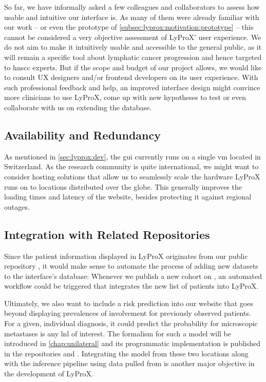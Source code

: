 \documentclass[\relativeRoot/main.tex]{subfiles}
\begin{document}
So far, we have informally asked a few colleagues and collaborators to assess how usable and intuitive our interface is. As many of them were already familiar with our work -- or even the prototype of \cref{subsec:lyprox:motivation:prototype} -- this cannot be considered a very objective assessment of LyProX' user experience. We do not aim to make it intuitively usable and accessible to the general public, as it will remain a specific tool about lymphatic cancer progression and hence targeted to \gls{hnscc} experts. But if the scope and budget of our project allows, we would like to consult UX designers and/or frontend developers on its user experience. With such professional feedback and help, an improved interface design might convince more clinicians to use LyProX, come up with new hypotheses to test or even collaborate with us on extending the database.

\subsection*{Availability and Redundancy}

As mentioned in \cref{sec:lyprox:dev}, the \gls{gui} currently runs on a single \gls{vm} located in Switzerland. As the research community is quite international, we might want to consider hosting solutions that allow us to seamlessly scale the hardware LyProX runs on to locations distributed over the globe. This generally improves the loading times and latency of the website, besides protecting it against regional outages.

\subsection*{Integration with Related Repositories}

Since the patient information displayed in LyProX originates from our public repository , it would make sense to automate the process of adding new datasets to the interface's database: Whenever we publish a new cohort on , an automated workflow could be triggered that integrates the new list of patients into LyProX.

Ultimately, we also want to include a risk prediction into our website that goes beyond displaying prevalences of involvement for previously observed patients. For a given, individual diagnosis, it could predict the probability for microscopic metastases is any \gls{lnl} of interest. The formalism for such a model will be introduced in \cref{chap:unilateral} and its programmatic implementation is published in the repositories  and . Integrating the model from these two locations along with the inference pipeline using data pulled from  is another major objective in the development of LyProX.
\end{document}
